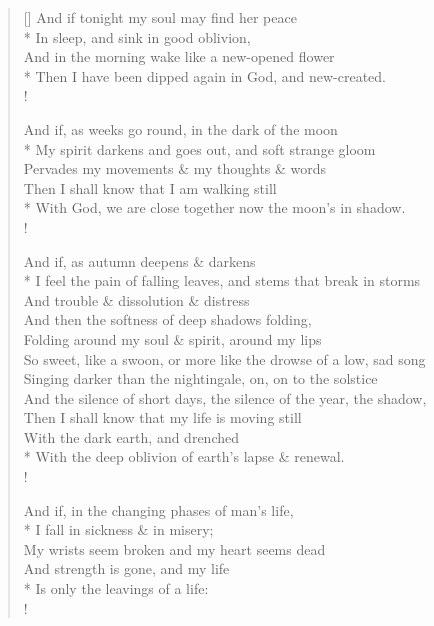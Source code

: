 \documentclass[MAIN]{subfiles}
\begin{document}
\settowidth{\versewidth}{And the silence of short days, the silence of the year, the shadow,}
\begin{verse}[\versewidth]
And if tonight my soul may find her peace\\*
In sleep, and sink in good oblivion,\\
And in the morning wake like a new-opened flower\\*
Then I have been dipped again in God, and new-created.\\!

And if, as weeks go round, in the dark of the moon\\*
My spirit darkens and goes out, and soft strange gloom\\
Pervades my movements \& my thoughts \& words\\
Then I shall know that I am walking still\\*
With God, we are close together now the moon's in shadow.\\!

And if, as autumn deepens \& darkens\\*
I feel the pain of falling leaves, and stems that break in storms\\
And trouble \& dissolution \& distress\\
And then the softness of deep shadows folding,\\
Folding around my soul \& spirit, around my lips\\
So sweet, like a swoon, or more like the drowse of a low, sad song\\
Singing darker than the nightingale, on, on to the solstice\\
And the silence of short days, the silence of the year, the shadow,\\
Then I shall know that my life is moving still\\
With the dark earth, and drenched\\*
With the deep oblivion of earth's lapse \& renewal.\\!

And if, in the changing phases of man's life,\\*
I fall in sickness \& in misery;\\
My wrists seem broken and my heart seems dead\\
And strength is gone, and my life\\*
Is only the leavings of a life:\\!


\end{verse}
\end{document}

